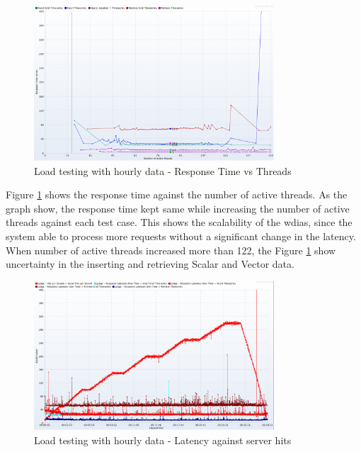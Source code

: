 \begin{figure}[htp]
    \centering
    \includegraphics[width=0.8\textwidth]{results/obs/all/obs_all_60m_response_times_vs_threads.png}
    \caption{Load testing with hourly data - Response Time vs Threads}
    \label{fi:test_obs_all_60m_response_vs_threads}
\end{figure}
Figure \ref{fi:test_obs_all_60m_response_vs_threads} shows the response time against the number of active threads. As the graph show, the response time kept same while increasing the number of active threads against each test case. This shows the scalability of the \acrshort{wdias}, since the system able to process more requests without a significant change in the latency.
When number of active threads increased more than 122, the Figure \ref{fi:test_obs_all_60m_response_vs_threads} show uncertainty in the inserting and retrieving Scalar and Vector data.

\begin{figure}[htp]
    \centering
    \includegraphics[width=0.8\textwidth]{results/obs/all/obs_all_60m_res_latencies_against_hits.png}
    \caption{Load testing with hourly data - Latency against server hits}
    \label{fi:test_obs_all_60m_latency}
\end{figure}

